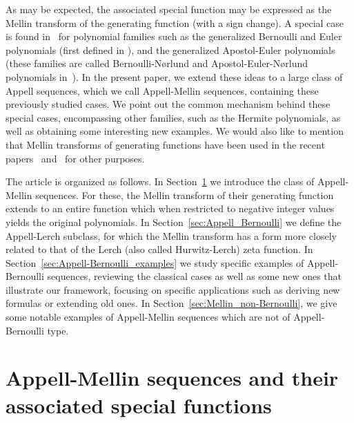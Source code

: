 \documentclass[11pt,a4paper]{amsart}
\theoremstyle{plain}
\theoremstyle{plain}
\theoremstyle{definition}
\theoremstyle{remark}
\begin{document}
As may be expected, the associated special function may be expressed as the Mellin transform of the generating function (with a sign change). A special case is found in~\cite[Theorem 4.1]{BaChi} for polynomial families such as the generalized Bernoulli and Euler polynomials (first defined in \cite{Nor,Nor-book}), and the generalized Apostol-Euler polynomials (these families are called Bernoulli-N{\o}rlund and Apostol-Euler-N{\o}rlund polynomials in~\cite{BaChi}). In the present paper, we extend these ideas to a large class of Appell sequences, which we call Appell-Mellin sequences, containing these previously studied cases. We point out the common mechanism behind these special cases, encompassing other families, such as the Hermite polynomials, as well as obtaining some interesting new examples.
We would also like to mention that Mellin transforms of generating functions have been used in the recent papers~\cite{CGale-I} and~\cite{CGale-II} for other purposes.


The article is organized as follows. In Section~\ref{sec:Appell-Mellin} we introduce the class of Appell-Mellin sequences. For these, the Mellin transform of their generating function extends to an entire function which when restricted to negative integer values yields the original polynomials. In Section~\ref{sec:Appell_Bernoulli} we define the Appell-Lerch subclass, for which the Mellin transform has a form more closely related to that of the Lerch (also called Hurwitz-Lerch) zeta function. In Section~\ref{sec:Appell-Bernoulli_examples} we study specific examples of Appell-Bernoulli sequences, reviewing the classical cases as well as some new ones that illustrate our framework, focusing on specific applications such as deriving new formulas or extending old ones. In Section~\ref{sec:Mellin_non-Bernoulli}, we give some notable examples of Appell-Mellin sequences which are not of Appell-Bernoulli type.


\section{Appell-Mellin sequences and their associated special functions}
\label{sec:Appell-Mellin}
\end{document}
